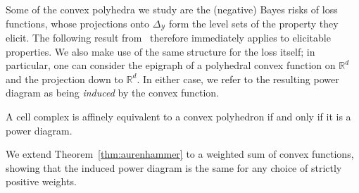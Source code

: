 \documentclass[twoside,11pt]{article}
\newcommand{\Comments}{1}
\newcommand{\mynote}[2]{\ifnum\Comments=1\textcolor{#1}{#2}\fi}
\newcommand{\raf}[1]{\mynote{darkgreen}{[RF: #1]}}
\newcommand{\reals}{\mathbb{R}}
\newcommand{\simplex}{\Delta_\Y}
\newcommand{\Y}{\mathcal{Y}}
\begin{document}
Some of the convex polyhedra we study are the (negative) Bayes risks of loss functions, whose projections onto $\simplex$ form the level sets of the property they elicit.
The following result from~\citet{aurenhammer1987power} therefore immediately applies to elicitable properties.
We also make use of the same structure for the loss itself; in particular, one can consider the epigraph of a polyhedral convex function on $\reals^d$ and the projection down to $\reals^d$.
In either case, we refer to the resulting power diagram as being \emph{induced} by the convex function.

\begin{theorem}\label{thm:aurenhammer}
	A cell complex is affinely equivalent to a convex polyhedron if and only if it is a power diagram.
\end{theorem}

We extend Theorem~\ref{thm:aurenhammer} to a weighted sum of convex functions, showing that the induced power diagram is the same for any choice of strictly positive weights.
\end{document}
